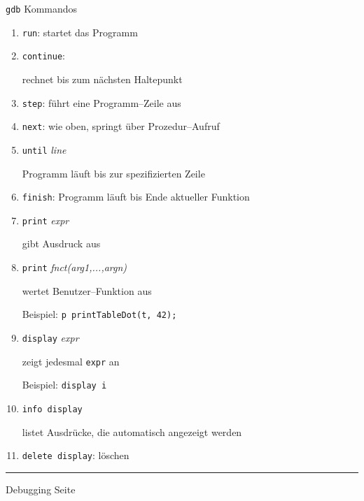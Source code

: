 \begin{slide}{}
\normalsize

\begin{center}
\texttt{gdb} Kommandos
\end{center}
\vspace*{0.5cm}

\footnotesize
\begin{enumerate}
\item \texttt{run}:  startet das Programm
\item \texttt{continue}: 

      rechnet bis zum n\"achsten Haltepunkt
\item \texttt{step}:
      f\"uhrt eine Programm--Zeile aus
\item \texttt{next}:
      wie oben, springt \"uber Prozedur--Aufruf
\item \texttt{until} \textsl{line}

      Programm l\"auft bis zur spezifizierten Zeile
\item \texttt{finish}: 
      Programm l\"auft bis Ende aktueller Funktion
\item \texttt{print} \textsl{expr}

       gibt Ausdruck aus
\item \texttt{print} \textsl{fnct(arg1,...,argn)}

          wertet Benutzer--Funktion aus
    
       Beispiel: \texttt{p printTableDot(t, 42);}

\item \texttt{display} \textsl{expr}

      zeigt jedesmal \texttt{expr} an

      Beispiel: \texttt{display i}

\item \texttt{info display} 

      listet Ausdr\"ucke, die automatisch angezeigt werden
\item \texttt{delete display}: l\"oschen
\end{enumerate}

\vspace*{\fill}
\tiny \addtocounter{mypage}{1}
\rule{17cm}{1mm}
Debugging  \hspace*{\fill} Seite 
\end{slide}


